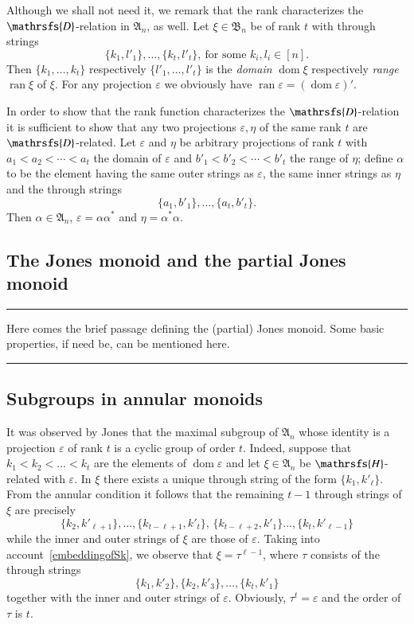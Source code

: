 \documentclass[preprint,1p,times]{elsarticle}
\DeclareMathOperator{\dom}{dom} \DeclareMathOperator{\ran}{ran}
\numberwithin{equation}{section}
\theoremstyle{remark}
\def\Dc{\mathrsfs{D}}
\def\Hc{\mathrsfs{H}}
\def\al{\alpha}
\def\ep{\varepsilon}
\def\A{\mathfrak{A}}
\def\B{\mathfrak{B}}
\begin{document}
Although we shall not need it, we remark that the rank characterizes the $\Dc$-relation in $\A_n$, as well. Let
$\xi\in\B_n$ be of rank $t$ with through strings
$$\{k_1,l'_1\},\dots,\{k_t,l'_t\},\ \mbox{for some } k_i,l_i\in [n].$$
Then $\{k_1,\dots, k_t\}$ respectively $\{l'_1,\dots,l'_t\}$ is the \emph{domain} $\dom \xi$ respectively \emph{range}
$\ran \xi$ of $\xi$. For any projection $\ep$ we obviously have $\ran \ep=(\dom \ep)'$.

In order to show that the rank function characterizes the $\Dc$-relation it is sufficient to show that any two
projections $\ep, \eta$ of the same rank $t$ are $\Dc$-related. Let $\ep$ and $\eta$ be arbitrary projections of rank
$t$ with $a_1<a_2<\cdots<a_t$  the domain of $\ep$ and $b'_1<b'_2<\cdots<b'_t$ the range of $\eta$; define $\alpha$ to
be the element having the same outer strings as $\ep$, the same inner strings as $\eta$ and the through strings
$$\{a_1,b'_1\},\dots,\{a_t,b'_t\}.$$
Then $\alpha\in \A_n$, $\ep=\al\al^*$ and $\eta=\al^*\al$.

\subsection{The Jones monoid and the partial Jones monoid}

\smallskip\hrule

\medskip

\textsf{Here comes the brief passage defining the (partial) Jones monoid. Some basic properties, if need be, can be
mentioned here.}

\medskip

\hrule\smallskip

\subsection{Subgroups in annular monoids}

It was observed by Jones \cite{jones} that the maximal subgroup of $\A_n$ whose identity is a projection $\ep$ of rank
$t$ is a cyclic group of order $t$. Indeed, suppose that $k_1<k_2<\dots<k_t$ are the elements of $\dom \ep$ and let
$\xi\in \A_n$ be $\Hc$-related with $\ep$. In $\xi$ there exists a unique through string of the form $\{k_1,k'_\ell\}$.
From the annular condition it follows that the remaining $t-1$ through strings of $\xi$ are precisely
$$\{k_2,k'_{\ell+1}\},\dots,\{k_{t-\ell+1},k'_t\},\,\{k_{t-\ell+2},k'_1\}\dots,
\{k_t,k'_{\ell-1}\}$$ while the inner and outer strings of $\xi$ are those of $\ep$. Taking into
account~\eqref{embeddingofSk}, we observe that $\xi=\tau^{\ell-1}$, where $\tau$ consists of the through strings
$$\{k_1,k'_2\},\{k_2,k'_3\},\dots,\{k_t,k'_1\}$$
together with the inner and outer strings of $\ep$. Obviously,
 $\tau^t=\ep$ and the order of $\tau$ is $t$.
\end{document}
